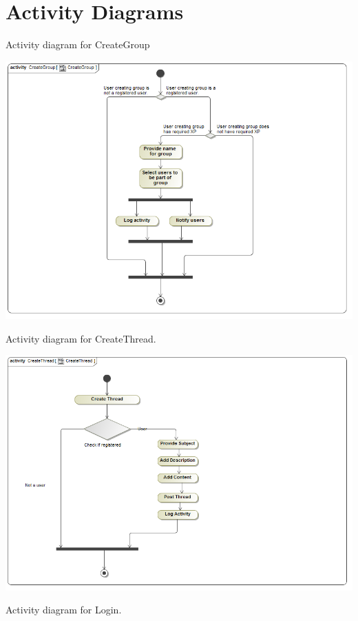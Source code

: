 \documentclass[pdftex,10pt,a4paper]{report}
\begin{document}
\section{Activity Diagrams}
\newpage
	\begin{description}
		\item[Activity diagram for CreateGroup] 
	\end{description}
	\includegraphics[width=\textwidth]{CreateGroup}
	\newpage
	\begin{description}
		\item[Activity diagram for CreateThread.] 
	\end{description}
	\includegraphics[width=\textwidth]{CreateThread}
		\begin{description}
		\item[Activity diagram for Login.] 
	\end{description}
\end{document}
